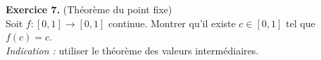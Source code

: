 \documentclass[a4paper, 10pt]{report}
\begin{document}
	\vspace{5mm}	
	\noindent
	\textbf{Exercice 7.} (Théorème du point fixe)\\
	Soit $f: [0, 1] \to [0, 1]$ continue. Montrer qu'il existe
	$c \in [0, 1]$ tel que $f(c) = c$.\\
	\textit{Indication :} utiliser le théorème des valeurs intermédiaires.	
	
	\fancyhf{}
	\renewcommand{\headrule}
	{\rule{\textwidth}{0pt}}
	
%	
%	
%	
	
\end{document}
